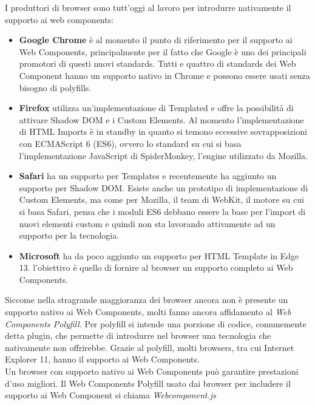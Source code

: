 I produttori di browser sono tutt’oggi al lavoro per introdurre nativamente il supporto ai web components:
\begin{itemize}
\item \textbf{Google Chrome} è al momento il punto di riferimento per il supporto ai Web Components, principalmente per il fatto che Google è uno dei principali promotori di questi nuovi standards. Tutti e quattro di standards dei Web Component hanno un supporto nativo in Chrome e possono essere usati senza bisogno di polyfills. \cite{web_comp2}
\item \textbf{Firefox} utilizza un’implementazione di Templated e offre la possibilità di attivare Shadow DOM e i Custom Elements. Al momento l’implementazione di HTML Imports è in standby in quanto si temono eccessive sovrapposizioni con ECMAScript 6 (ES6), ovvero lo standard su cui si basa l’implementazione JavaScript di SpiderMonkey, l’engine utilizzato da Mozilla. 
\item \textbf{Safari} ha un supporto per Templates e recentemente ha aggiunto un supporto per Shadow DOM. Esiste anche un prototipo di implementazione di Custom Elements, ma come per Mozilla, il team di WebKit, il motore su cui si basa Safari, pensa che i moduli ES6 debbano essere la base per l’import di nuovi elementi custom e quindi non sta lavorando attivamente ad un supporto per la tecnologia.
\item \textbf{Microsoft} ha da poco aggiunto un supporto per HTML Template in Edge 13. l’obiettivo è quello di fornire al browser un supporto completo ai Web Components.
\end{itemize}
Siccome nella stragrande maggioranza dei browser ancora non è presente un supporto nativo ai Web Components, molti fanno ancora affidamento al \emph{Web Components Polyfill}.
Per polyfill si intende una porzione di codice, comunemente detta plugin, che permette di introdurre nel browser una tecnologia che nativamente non offrirebbe. 
Grazie al polyfill, molti browsers, tra cui Internet Explorer 11, hanno il supporto ai Web Components.
\\
Un browser con supporto nativo ai Web Components può garantire prestazioni d’uso migliori. Il Web Components Polyfill usato dai browser per includere il supporto ai Web Component si chiama \emph{Webcomponent.js}


